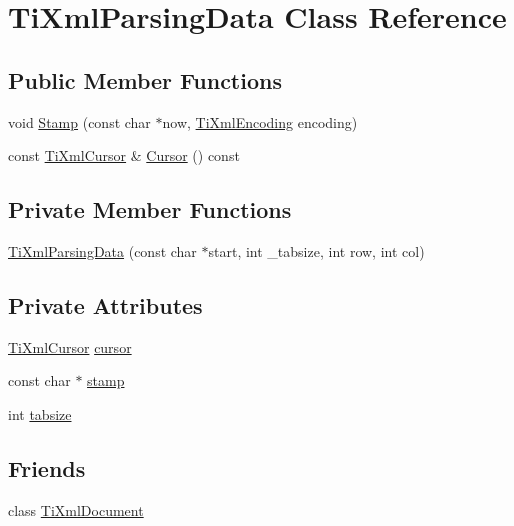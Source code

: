 \hypertarget{class_ti_xml_parsing_data}{
\section{TiXmlParsingData Class Reference}
\label{class_ti_xml_parsing_data}
}
\subsection*{Public Member Functions}
\begin{DoxyCompactItemize}
\item 
void \hyperlink{class_ti_xml_parsing_data_a65cee8ab77a36c605db08c84b4c30a7d}{Stamp} (const char $\ast$now, \hyperlink{tinyxml_8h_a88d51847a13ee0f4b4d320d03d2c4d96}{TiXmlEncoding} encoding)
\item 
const \hyperlink{struct_ti_xml_cursor}{TiXmlCursor} \& \hyperlink{class_ti_xml_parsing_data_a9e63d965fdb53ff4ac711e105269e918}{Cursor} () const 
\end{DoxyCompactItemize}
\subsection*{Private Member Functions}
\begin{DoxyCompactItemize}
\item 
\hyperlink{class_ti_xml_parsing_data_aa5beaf71579a91d6942277f417899ab9}{TiXmlParsingData} (const char $\ast$start, int \_\-tabsize, int row, int col)
\end{DoxyCompactItemize}
\subsection*{Private Attributes}
\begin{DoxyCompactItemize}
\item 
\hyperlink{struct_ti_xml_cursor}{TiXmlCursor} \hyperlink{class_ti_xml_parsing_data_abee4c6c657f595182a4f8beda4fa1c7d}{cursor}
\item 
const char $\ast$ \hyperlink{class_ti_xml_parsing_data_a0e3c2ea5a8b738d733735ca0318fe4ff}{stamp}
\item 
int \hyperlink{class_ti_xml_parsing_data_ab9d6aea2833e38aaef440e49c22a05ca}{tabsize}
\end{DoxyCompactItemize}
\subsection*{Friends}
\begin{DoxyCompactItemize}
\item 
class \hyperlink{class_ti_xml_parsing_data_a173617f6dfe902cf484ce5552b950475}{TiXmlDocument}
\end{DoxyCompactItemize}


